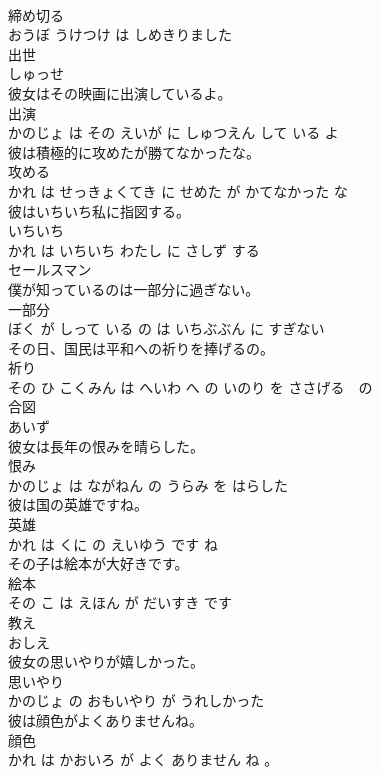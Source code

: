 \documentclass[8pt]{extreport}
\begin{document}
\begin{CJK}{UTF8}{min}
\\	締め切る 
\\	おうぼ うけつけ は しめきりました			
\\	出世	
\\	しゅっせ			
\\	彼女はその映画に出演しているよ。	
\\	出演 
\\	かのじょ は その えいが に しゅつえん して いる よ			
\\	彼は積極的に攻めたが勝てなかったな。	
\\	攻める 
\\	かれ は せっきょくてき に せめた が かてなかった な			
\\	彼はいちいち私に指図する。	
\\	いちいち 
\\	かれ は いちいち わたし に さしず する			
\\	セールスマン	
\\	僕が知っているのは一部分に過ぎない。	
\\	一部分 
\\	ぼく が しって いる の は いちぶぶん に すぎない			
\\	その日、国民は平和への祈りを捧げるの。	
\\	祈り 
\\	その ひ こくみん は へいわ へ の いのり を ささげる　の			
\\	合図	
\\	あいず			
\\	彼女は長年の恨みを晴らした。	
\\	恨み 
\\	かのじょ は ながねん の うらみ を はらした			
\\	彼は国の英雄ですね。	
\\	英雄 
\\	かれ は くに の えいゆう です ね			
\\	その子は絵本が大好きです。	
\\	絵本 
\\	その こ は えほん が だいすき です			
\\	教え	
\\	おしえ			
\\	彼女の思いやりが嬉しかった。	
\\	思いやり 
\\	かのじょ の おもいやり が うれしかった			
\\	彼は顔色がよくありませんね。	
\\	顔色 
\\	かれ は かおいろ が よく ありません ね 。			

\end{CJK}
\end{document}
